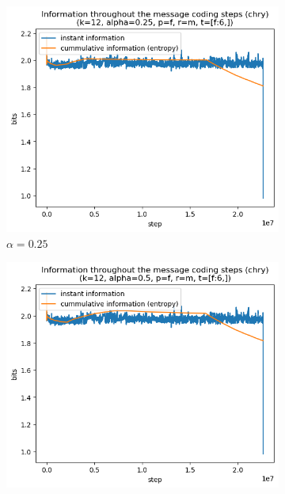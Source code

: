 \documentclass{article}
\begin{document}
\begin{figure}
    \begin{subfigure}[b]{0.3\textwidth}
        \begin{center}
            \includegraphics[width=1.0\linewidth]{../scripts/images/chry_12_0.25_f_m_[f:6,].png}
        \end{center}
        \caption{$\alpha = 0.25$}
        \label{fig:results-alpha-0.25}
    \end{subfigure}
    \hfill
    \begin{subfigure}[b]{0.3\textwidth}
        \begin{center}
            \includegraphics[width=1.0\linewidth]{../scripts/images/chry_12_0.5_f_m_[f:6,].png}

\end{center}
\end{subfigure}
\end{figure}
\end{document}
